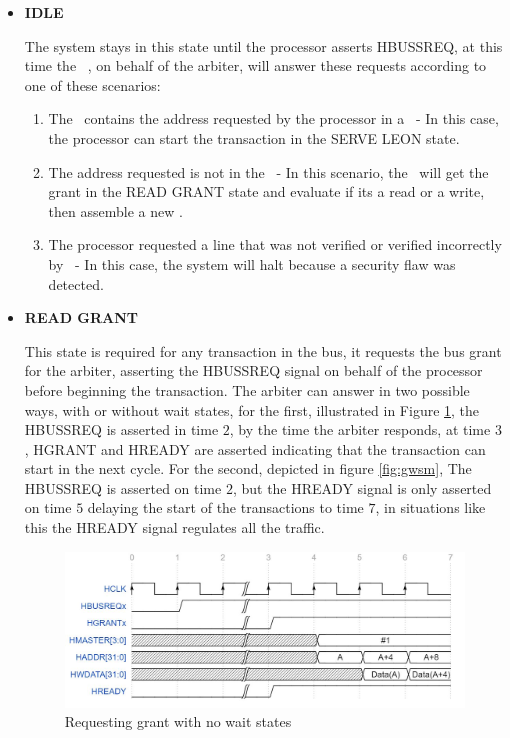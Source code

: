 \begin{itemize}
 \item{\textbf{IDLE}}
 
The system stays in this state until the processor asserts HBUSSREQ, at this time the \handler~, on behalf of the arbiter, will answer these requests according to one of these scenarios:
 \begin{enumerate}
     \item The \sbuf~contains the address requested by the processor in a \sline~- In this case, the processor can start the transaction in the SERVE LEON state.
     \item The address requested is not in the \sbuf~- In this scenario, the \handler~will get the grant in the READ GRANT state and evaluate if its a read or a write, then assemble a new \sline.
     \item The processor requested a line that was not verified or verified incorrectly by \seceng~-  In this case, the system will halt because a security flaw was detected.
 \end{enumerate}

 
  \item{\textbf{READ GRANT}}

  This state is required for any transaction in the bus, it requests the bus grant for the arbiter, asserting the HBUSSREQ signal on behalf of the processor before beginning the transaction. The arbiter can answer in two possible ways, with or without wait states, for the first, illustrated in Figure \ref{fig:gnwsm},  the HBUSSREQ is asserted in time $2$, by the time the arbiter responds, at time $3$, HGRANT and HREADY are asserted  indicating that the transaction can start in the next cycle. For the second, depicted in figure \ref{fig:gwsm}, The  HBUSSREQ is asserted on time $2$, but the HREADY signal is only asserted on time $5$ delaying the start of the transactions to time $7$, in situations like this the HREADY signal regulates all the traffic. 
  
  
\begin{figure}[!ht]
    \centering
    \includegraphics[width=\textwidth]{figures/others/read_grant_no_wait_new.JPG}
    \caption{Requesting grant with no wait states  }
    \label{fig:gnwsm}
\end{figure}



\end{itemize}
